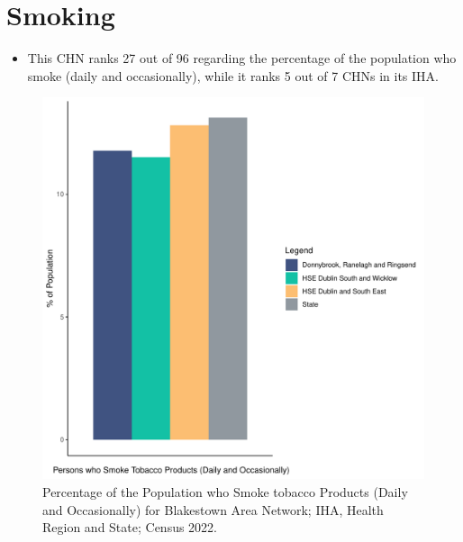 \documentclass{article}
\begin{document}
\pagebreak

\section{Smoking}\label{sect:Smoking}
\begin{itemize}
\item This CHN ranks  27 out of 96 regarding the percentage of the population who smoke (daily and occasionally), while it ranks   5 out of 7 CHNs in its IHA.
\end{itemize}
\begin{figure}[H]
	\centering
	\includegraphics[width = 120mm]{../figures/SmokingED.pdf}
	\caption{Percentage of the Population who Smoke tobacco Products (Daily and Occasionally) for Blakestown Area Network; IHA, Health Region and State; Census 2022.}
	\label{fig:2ae19629-1a6a-13a3-e055-000000000001}
	\end{figure}
	
\end{document}
